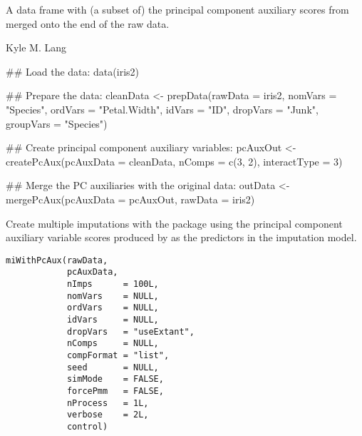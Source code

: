 \documentclass[letterpaper]{book}
\begin{document}
%
\begin{Value}
A data frame with (a subset of) the principal component auxiliary
scores from  merged onto the end of the raw
data. 
\end{Value}
%
\begin{Author}\relax
Kyle M. Lang
\end{Author}
%
\begin{Examples}
\begin{ExampleCode}
## Load the data:
data(iris2)

## Prepare the data:
cleanData <- prepData(rawData   = iris2,
                      nomVars   = "Species",
                      ordVars   = "Petal.Width",
                      idVars    = "ID",
                      dropVars  = "Junk",
                      groupVars = "Species")

## Create principal component auxiliary variables:
pcAuxOut <- createPcAux(pcAuxData    = cleanData,
                        nComps       = c(3, 2),
                        interactType = 3)

## Merge the PC auxiliaries with the original data:
outData <- mergePcAux(pcAuxData = pcAuxOut, rawData = iris2)
\end{ExampleCode}
\end{Examples}
%
\begin{Description}\relax
Create multiple imputations with the  package using the
principal component auxiliary variable scores produced by
 as the predictors in the imputation model.
\end{Description}
%
\begin{Usage}
\begin{verbatim}
miWithPcAux(rawData,
            pcAuxData,
            nImps      = 100L,
            nomVars    = NULL,
            ordVars    = NULL,
            idVars     = NULL,
            dropVars   = "useExtant",
            nComps     = NULL,
            compFormat = "list",
            seed       = NULL,
            simMode    = FALSE,
            forcePmm   = FALSE,
            nProcess   = 1L,
            verbose    = 2L,
            control)
\end{verbatim}
\end{Usage}
%
\end{document}
